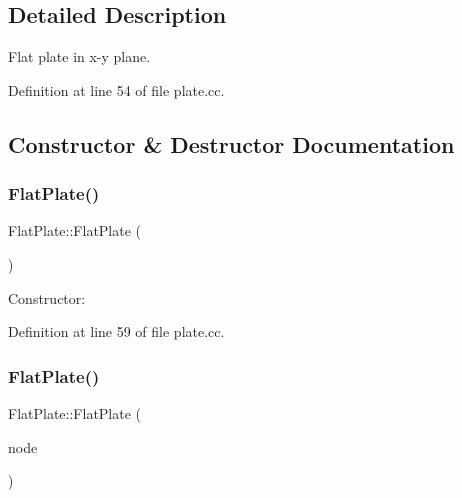 \subsection{Detailed Description}
Flat plate in x-\/y plane. 

Definition at line 54 of file plate.\+cc.



\subsection{Constructor \& Destructor Documentation}
\mbox{\label{classFlatPlate_a5a0e45f57f8d40885e220349aa1beaa6}} 
\subsubsection{\texorpdfstring{Flat\+Plate()}{FlatPlate()}\hspace{0.1cm}{\footnotesize\ttfamily [1/2]}}
{\footnotesize\ttfamily Flat\+Plate\+::\+Flat\+Plate (\begin{DoxyParamCaption}{ }\end{DoxyParamCaption})\hspace{0.3cm}{\ttfamily [inline]}}



Constructor\+: 



Definition at line 59 of file plate.\+cc.

\mbox{\label{classFlatPlate_a8d235775f64d0241d8111d3a743e1b49}} 
\subsubsection{\texorpdfstring{Flat\+Plate()}{FlatPlate()}\hspace{0.1cm}{\footnotesize\ttfamily [2/2]}}
{\footnotesize\ttfamily Flat\+Plate\+::\+Flat\+Plate (\begin{DoxyParamCaption}\item[{const \hyperlink{classFlatPlate}{Flat\+Plate} \&}]{node }\end{DoxyParamCaption})\hspace{0.3cm}{\ttfamily [inline]}}



